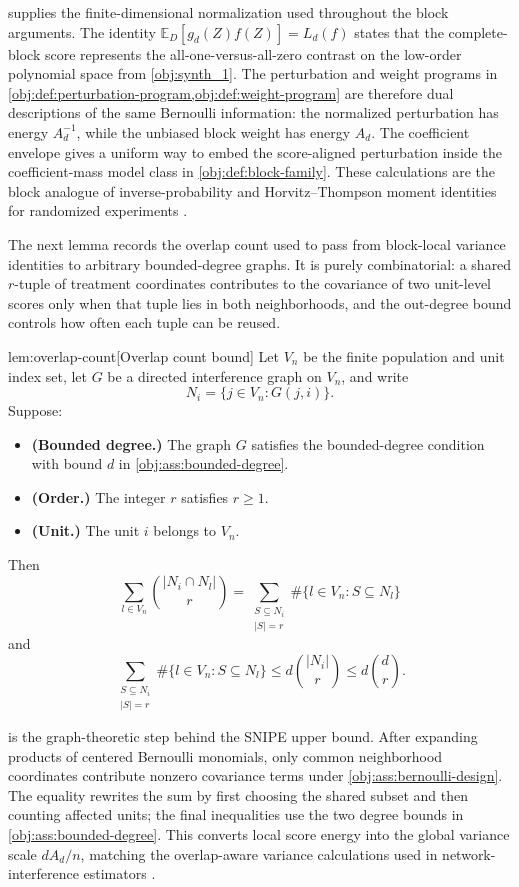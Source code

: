  supplies the finite-dimensional normalization used throughout the block arguments. The identity \(\mathbb E_D[g_d(Z)f(Z)]=L_d(f)\) states that the complete-block score represents the all-one-versus-all-zero contrast on the low-order polynomial space from \cref{obj:synth_1}. The perturbation and weight programs in \cref{obj:def:perturbation-program,obj:def:weight-program} are therefore dual descriptions of the same Bernoulli information: the normalized perturbation has energy \(A_d^{-1}\), while the unbiased block weight has energy \(A_d\). The coefficient envelope gives a uniform way to embed the score-aligned perturbation inside the coefficient-mass model class in \cref{obj:def:block-family}. These calculations are the block analogue of inverse-probability and Horvitz--Thompson moment identities for randomized experiments \citep{HorvitzThompson1952,Aronow2017}.

The next lemma records the overlap count used to pass from block-local variance identities to arbitrary bounded-degree graphs. It is purely combinatorial: a shared \(r\)-tuple of treatment coordinates contributes to the covariance of two unit-level scores only when that tuple lies in both neighborhoods, and the out-degree bound controls how often each tuple can be reused.

\begin{lemmav}{lem:overlap-count}[Overlap count bound]
Let \(V_n\) be the finite population and unit index set, let \(G\) be a directed interference graph on \(V_n\), and write
\[
N_i=\{j\in V_n:G(j,i)\}.
\]
Suppose:
\begin{itemize}
\item \textbf{(Bounded degree.)} The graph \(G\) satisfies the bounded-degree condition with bound \(d\) in \cref{obj:ass:bounded-degree}.
\item \textbf{(Order.)} The integer \(r\) satisfies \(r\ge 1\).
\item \textbf{(Unit.)} The unit \(i\) belongs to \(V_n\).
\end{itemize}
Then
\[
\sum_{l\in V_n}\binom{|N_i\cap N_l|}{r}
=
\sum_{\substack{S\subseteq N_i\\ |S|=r}}
\#\{l\in V_n:S\subseteq N_l\}
\]
and
\[
\sum_{\substack{S\subseteq N_i\\ |S|=r}}
\#\{l\in V_n:S\subseteq N_l\}
\le
d\binom{|N_i|}{r}
\le
d\binom{d}{r}.
\]
\end{lemmav}

 is the graph-theoretic step behind the SNIPE upper bound. After expanding products of centered Bernoulli monomials, only common neighborhood coordinates contribute nonzero covariance terms under \cref{obj:ass:bernoulli-design}. The equality rewrites the sum by first choosing the shared subset and then counting affected units; the final inequalities use the two degree bounds in \cref{obj:ass:bounded-degree}. This converts local score energy into the global variance scale \(dA_d/n\), matching the overlap-aware variance calculations used in network-interference estimators \citep{CortezRodriguezEichhornYu2023,HarshawSavjeWang2025}.


